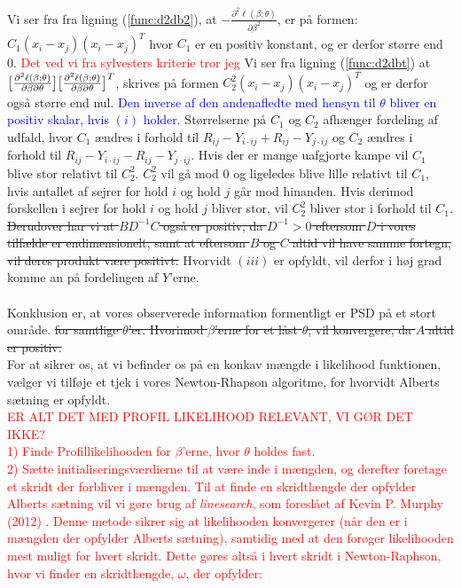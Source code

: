 \documentclass[11pt,a4paper]{article}
\begin{document}
Vi ser fra fra ligning (\ref{func:d2db2}), at $-\frac{\partial^2 \ell(\beta;\theta)}{\partial \beta^2}$, er på formen: $C_1(x_i-x_j)(x_i-x_j)^T$ hvor $C_1$ er en positiv konstant, og er derfor større end 0. \textcolor{red}{Det ved vi fra sylvesters kriterie tror jeg}
Vi ser fra ligning (\ref{func:d2dbt}) at $\big{[}\frac{\partial^2 \ell(\beta;\theta)}{\partial \beta \partial \theta}\big{]}\big{[}\frac{\partial^2 \ell(\beta;\theta)}{\partial \beta \partial \theta}\big{]}^T$, skrives på formen $C_2^2(x_i-x_j)(x_i-x_j)^T$ og er derfor også større end nul. \textcolor{blue}{ Den inverse af den andenafledte med hensyn til $\theta$ bliver en positiv skalar, hvis $(i)$ holder.} Størrelserne på $C_1$ og $C_2$ afhænger fordeling af udfald, hvor $C_1$ ændres i forhold til $R_{ij}-Y_{i\cdot ij} + R_{ij}-Y_{j\cdot ij}$ og $C_2$ ændres i forhold til $R_{ij}-Y_{i\cdot ij} - R_{ij}-Y_{j\cdot ij}$. Hvis der er mange uafgjorte kampe vil $C_1$ blive stor relativt til $C_2^2$. $C_2^2$ vil gå mod 0 og ligeledes blive lille relativt til $C_1$, hvis antallet af sejrer for hold $i$ og hold $j$ går mod hinanden. Hvis derimod forskellen i sejrer for hold $i$ og hold $j$ bliver stor, vil $C_2^2$ bliver stor i forhold til $C_1$. \sout{ Derudover har vi at $BD^{-1}C$ også er positiv, da $D^{-1}>0$ eftersom $D$ i vores tilfælde er endimensionelt, samt at eftersom $B$ og $C$ altid vil have samme fortegn, vil deres produkt være positivt.} Hvorvidt $(iii)$ er opfyldt, vil derfor i høj grad komme an på fordelingen af $Y$'erne. \\\\
Konklusion er, at vores observerede information formentligt er PSD på et stort område. \sout{for samtlige $\theta$'er. Hvorimod $\beta$'erne for et låst $\theta$, vil konvergere, da $A$ altid er positiv.}\\
For at sikrer os, at vi befinder os på en konkav mængde i likelihood funktionen, vælger vi tilføje et tjek i vores Newton-Rhapson algoritme, for hvorvidt Alberts sætning er opfyldt. \\
\textcolor{red}{ER ALT DET MED PROFIL LIKELIHOOD RELEVANT, VI GØR DET IKKE?\\
1) Finde Profillikelihooden for $\beta$'erne, hvor $\theta$ holdes fast.\\
2) Sætte initialiseringsværdierne til at være inde i mængden, og derefter foretage et skridt der forbliver i mængden. Til at finde en skridtlængde der opfylder Alberts sætning vil vi gøre brug af \textit{linesearch}, som foreslået af Kevin P. Murphy (2012) \cite{LineSearch}. Denne metode sikrer sig at likelihooden konvergerer (når den er i mængden der opfylder Alberts sætning), samtidig med at den forøger likelihooden mest muligt for hvert skridt. Dette gøres altså i hvert skridt i Newton-Raphson, hvor vi finder en skridtlængde, $\omega$, der opfylder:}\\
\end{document}
